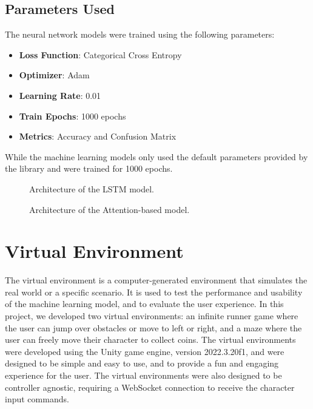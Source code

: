 \subsection*{Parameters Used}
The neural network models were trained using the following parameters:
\begin{itemize}
    \item \textbf{Loss Function}: Categorical Cross Entropy
    \item \textbf{Optimizer}: Adam
    \item \textbf{Learning Rate}: 0.01
    \item \textbf{Train Epochs}: 1000 epochs
    \item \textbf{Metrics}: Accuracy and Confusion Matrix
\end{itemize}
While the machine learning models only used the default parameters provided by the library and were trained for 1000 epochs.
\begin{figure}[!htbp]
    \centering
    \begin{minipage}[c]{.45\textwidth}
        \centering    
        \caption{Architecture of the LSTM model.}
        \label{fig:lstm_model}
    \end{minipage}
    \begin{minipage}[c]{.45\textwidth}
        \centering
        \caption{Architecture of the Attention-based model.}
        \label{fig:attention_model}
    \end{minipage}
\end{figure}

\section{Virtual Environment}
The virtual environment is a computer-generated environment that simulates the real world or a specific scenario.
It is used to test the performance and usability of the machine learning model, and to evaluate the user experience.
In this project, we developed two virtual environments: an infinite runner game where the user can jump over obstacles or move to left or right, and a maze where the user can freely move their character to collect coins.
The virtual environments were developed using the Unity game engine, version 2022.3.20f1, and were designed to be simple and easy to use, and to provide a fun and engaging experience for the user.
The virtual environments were also designed to be controller agnostic, requiring a WebSocket connection to receive the character input commands.
